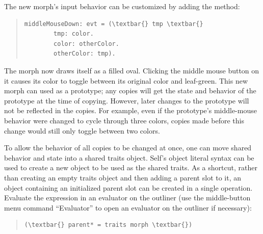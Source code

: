 \documentclass[letterpaper,10pt,english]{sphinxmanual}
\begin{document}
The new morph's input behavior can be customized by adding the method:
\begin{quote}

\begin{Verbatim}[commandchars=\\\{\}]
middleMouseDown: evt = (\textbar{} tmp \textbar{}
        tmp: color.
        color: otherColor.
        otherColor: tmp).
\end{Verbatim}
\end{quote}

The morph now draws itself as a filled oval. Clicking the middle mouse button on it causes its color to toggle between its original color and leaf-green. This new morph can used as a prototype; any copies will get the state and behavior of the prototype at the time of copying. However, later changes to the prototype will not be reflected in the copies. For example, even if the prototype's middle-mouse behavior were changed to cycle through three colors, copies made before this change would still only toggle between two colors.

To allow the behavior of all copies to be changed at once, one can move shared behavior and state into a shared traits object. Self's object literal syntax can be used to create a new object to be used as the shared traits. As a shortcut, rather than creating an empty traits object and then adding a parent slot to it, an object containing an initialized parent slot can be created in a single operation. Evaluate the expression in an evaluator on the outliner (use the middle-button menu command ``Evaluator'' to open an evaluator on the outliner if necessary):
\begin{quote}

\begin{Verbatim}[commandchars=\\\{\}]
(\textbar{} parent* = traits morph \textbar{})
\end{Verbatim}
\end{quote}
\end{document}
